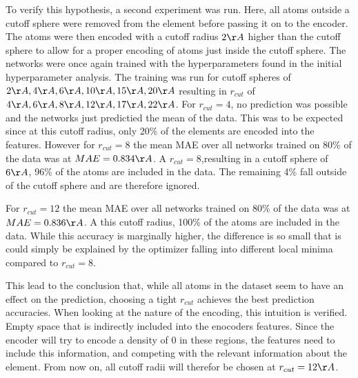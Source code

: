 To verify this hypothesis, a second experiment was run.
Here, all atoms outside a cutoff sphere were removed from the element before passing it on to the encoder.
The atoms were then encoded with a cutoff radius $2 \AA$ higher than the cutoff sphere to allow for a proper 
encoding of atoms just inside the cutoff sphere.
The networks were once again trained with the hyperparameters found in the initial hyperparameter analysis.
The training was run for cutoff spheres of $2\AA, 4\AA, 6\AA, 10\AA, 15\AA, 20\AA$ resulting in $r_{cut}$ 
of $4\AA, 6\AA, 8\AA, 12\AA, 17\AA, 22\AA$.
For $r_{cut}=4$, no prediction was possible and the networks just predictied the mean of the data.
This was to be expected since at this cutoff radius, only 20\% of the elements are encoded into the features.
However for $r_{cut}=8$ the mean MAE over all networks trained on 80\% of the data was at $MAE = 0.834 \AA$. 
A $r_{cut} = 8$,resulting in a cutoff sphere of $6 \AA$, 96\% of the atoms are included in the data. 
The remaining 4\% fall outside of the cutoff sphere and are therefore ignored. 

For $r_{cut}=12$ the mean MAE over all networks trained on 80\% of the data was at $MAE = 0.836 \AA$. 
A this cutoff radius, 100\% of the atoms are included in the data.
While this accuracy is marginally higher, the difference is so small that is could 
simply be explained by the optimizer falling into different local minima compared to $r_{cut}=8$. 

This lead to the conclusion that, while all atoms in the dataset seem to have an effect on the prediction,
choosing a tight $r_{cut}$ achieves the best prediction accuracies.
When looking at the nature of the encoding, this intuition is verified.
Empty space that is indirectly included into the enocoders features.
Since the encoder will try to encode a density of 0 in these regions, the features 
need to include this information, and competing with the relevant information about the element.
From now on, all cutoff radii will therefor be chosen at $r_{cut} = 12 \AA$.


